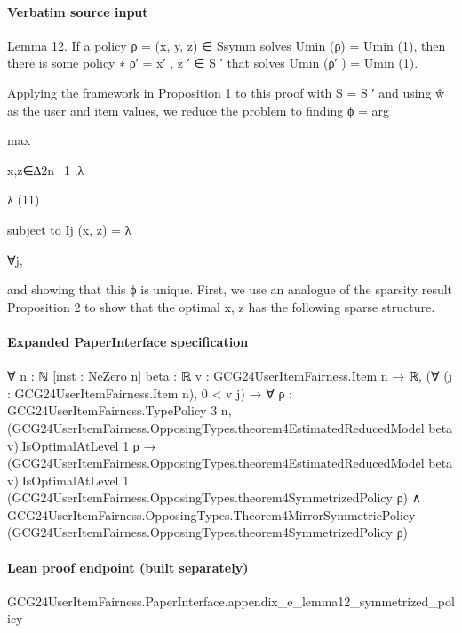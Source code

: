\documentclass[10pt]{article}
\begin{document}
\paragraph{Verbatim source input}
\begin{ReviewVerbatim}
Lemma 12. If a policy ρ = (x, y, z) ∈ Ssymm solves Umin (ρ) = Umin
(1), then there is some policy
∗
ρ′ = x′ , z ′ ∈ S ′ that solves Umin (ρ′ ) = Umin
(1).

Applying the framework in Proposition 1 to this proof with S = S ′ and using ŵ as the user and item
values, we reduce the problem to finding
ϕ = arg

max

x,z∈∆2n−1 ,λ

λ
(11)

subject to Ij (x, z) = λ

∀j,

and showing that this ϕ is unique.
First, we use an analogue of the sparsity result Proposition 2 to show that the optimal x, z has the
following sparse structure.
\end{ReviewVerbatim}


\paragraph{Expanded PaperInterface specification}
\begin{ReviewVerbatim}
∀ {n : ℕ} [inst : NeZero n] {beta : ℝ} {v : GCG24UserItemFairness.Item n → ℝ},
  (∀ (j : GCG24UserItemFairness.Item n), 0 < v j) →
    ∀ {ρ : GCG24UserItemFairness.TypePolicy 3 n},
      (GCG24UserItemFairness.OpposingTypes.theorem4EstimatedReducedModel beta v).IsOptimalAtLevel 1 ρ →
        (GCG24UserItemFairness.OpposingTypes.theorem4EstimatedReducedModel beta v).IsOptimalAtLevel 1
            (GCG24UserItemFairness.OpposingTypes.theorem4SymmetrizedPolicy ρ) ∧
          GCG24UserItemFairness.OpposingTypes.Theorem4MirrorSymmetricPolicy
            (GCG24UserItemFairness.OpposingTypes.theorem4SymmetrizedPolicy ρ)
\end{ReviewVerbatim}

\paragraph{Lean proof endpoint (built separately)}\begin{ReviewVerbatim}
GCG24UserItemFairness.PaperInterface.appendix_e_lemma12_symmetrized_policy
\end{ReviewVerbatim}
\end{document}
